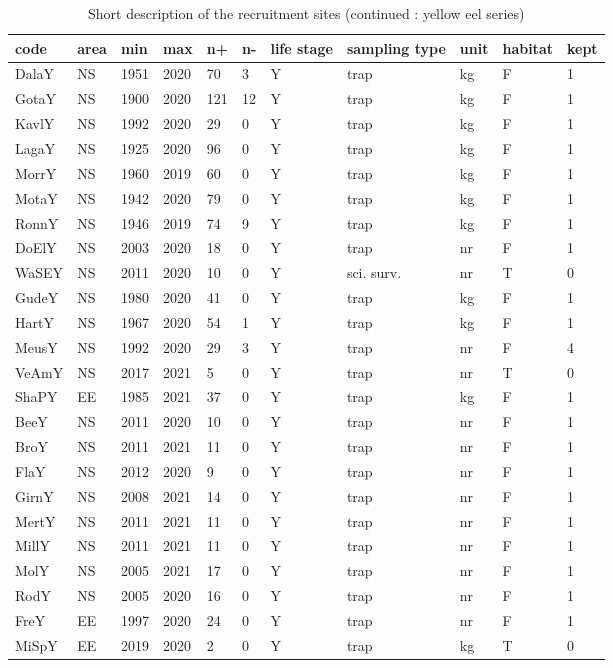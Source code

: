 \begin{table}[htbp]
\centering
\caption{Short description of the recruitment sites (continued : yellow eel series) } 
\label{statseriesY}
\begin{tabular}{p{1cm}p{1cm}p{1cm}p{1cm}p{0.8cm}p{0.8cm}p{1cm}p{2cm}p{2cm}p{1cm}p{1cm}}
  \hline
code & area & min & max & n+ & n- & life stage & sampling type & unit & habitat & kept \\ 
  \hline
DalaY & NS & 1951 & 2020 & 70 & 3 & Y & trap & kg & F & 1 \\ 
  GotaY & NS & 1900 & 2020 & 121 & 12 & Y & trap & kg & F & 1 \\ 
  KavlY & NS & 1992 & 2020 & 29 & 0 & Y & trap & kg & F & 1 \\ 
  LagaY & NS & 1925 & 2020 & 96 & 0 & Y & trap & kg & F & 1 \\ 
  MorrY & NS & 1960 & 2019 & 60 & 0 & Y & trap & kg & F & 1 \\ 
  MotaY & NS & 1942 & 2020 & 79 & 0 & Y & trap & kg & F & 1 \\ 
  RonnY & NS & 1946 & 2019 & 74 & 9 & Y & trap & kg & F & 1 \\ 
  DoElY & NS & 2003 & 2020 & 18 & 0 & Y & trap & nr & F & 1 \\ 
  WaSEY & NS & 2011 & 2020 & 10 & 0 & Y & sci. surv. & nr & T & 0 \\ 
  GudeY & NS & 1980 & 2020 & 41 & 0 & Y & trap & kg & F & 1 \\ 
  HartY & NS & 1967 & 2020 & 54 & 1 & Y & trap & kg & F & 1 \\ 
  MeusY & NS & 1992 & 2020 & 29 & 3 & Y & trap & nr & F & 4 \\ 
  VeAmY & NS & 2017 & 2021 & 5 & 0 & Y & trap & nr & T & 0 \\ 
  ShaPY & EE & 1985 & 2021 & 37 & 0 & Y & trap & kg & F & 1 \\ 
  BeeY & NS & 2011 & 2020 & 10 & 0 & Y & trap & nr & F & 1 \\ 
  BroY & NS & 2011 & 2021 & 11 & 0 & Y & trap & nr & F & 1 \\ 
  FlaY & NS & 2012 & 2020 & 9 & 0 & Y & trap & nr & F & 1 \\ 
  GirnY & NS & 2008 & 2021 & 14 & 0 & Y & trap & nr & F & 1 \\ 
  MertY & NS & 2011 & 2021 & 11 & 0 & Y & trap & nr & F & 1 \\ 
  MillY & NS & 2011 & 2021 & 11 & 0 & Y & trap & nr & F & 1 \\ 
  MolY & NS & 2005 & 2021 & 17 & 0 & Y & trap & nr & F & 1 \\ 
  RodY & NS & 2005 & 2020 & 16 & 0 & Y & trap & nr & F & 1 \\ 
  FreY & EE & 1997 & 2020 & 24 & 0 & Y & trap & nr & F & 1 \\ 
  MiSpY & EE & 2019 & 2020 & 2 & 0 & Y & trap & kg & T & 0 \\ 
   \hline
\end{tabular}
\end{table}
